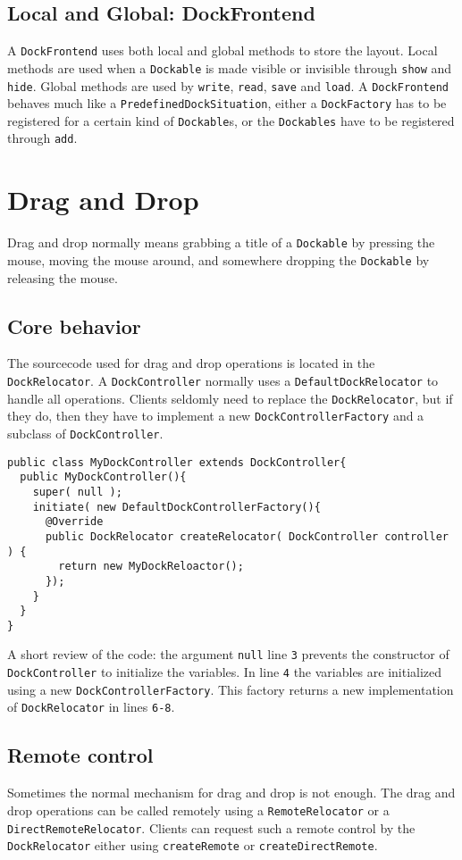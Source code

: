\documentclass[a4paper,10pt]{article}
\newcommand{\src}[1]{\lstinline[basicstyle=\ttfamily]|#1|}
\begin{document}
\subsection{Local and Global: DockFrontend}
A \src{DockFrontend} uses both local and global methods to store the layout. Local methods are used when a \src{Dockable} is made visible or invisible through \src{show} and \src{hide}. Global methods are used by \src{write}, \src{read}, \src{save} and \src{load}. A \src{DockFrontend} behaves much like a \src{PredefinedDockSituation}, either a \src{DockFactory} has to be registered for a certain kind of \src{Dockable}s, or the \src{Dockables} have to be registered through \src{add}.

\section{Drag and Drop}
Drag and drop normally means grabbing a title of a \src{Dockable} by pressing the mouse, moving the mouse around, and somewhere dropping the \src{Dockable} by releasing the mouse.
\subsection{Core behavior}
The sourcecode used for drag and drop operations is located in the \src{DockRelocator}. A \src{DockController} normally uses a \src{DefaultDockRelocator} to handle all operations. Clients seldomly need to replace the \src{DockRelocator}, but if they do, then they have to implement a new \src{DockControllerFactory} and a subclass of \src{DockController}.
\begin{lstlisting}
public class MyDockController extends DockController{
  public MyDockController(){	
    super( null );
    initiate( new DefaultDockControllerFactory(){
      @Override
      public DockRelocator createRelocator( DockController controller ) {
        return new MyDockReloactor();
      });
    }
  }
}
\end{lstlisting}
A short review of the code: the argument \src{null} line \src{3} prevents the constructor of \src{DockController} to initialize the variables. In line \src{4} the variables are initialized using a new \src{DockControllerFactory}. This factory returns a new implementation of \src{DockRelocator} in lines \src{6-8}.

\subsection{Remote control}
Sometimes the normal mechanism for drag and drop is not enough. The drag and drop operations can be called remotely using a \src{RemoteRelocator} or a \src{DirectRemoteRelocator}. Clients can request such a remote control by the \src{DockRelocator} either using \src{createRemote} or \src{createDirectRemote}.
\end{document}
